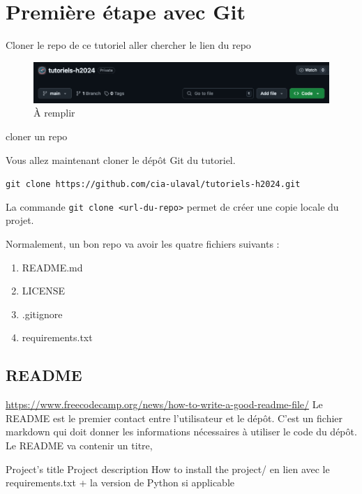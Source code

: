 \documentclass{book}
\newenvironment{myexampleblock}[1]{%
    \tcolorbox[beamer,%
    noparskip,breakable,
    colback=LightGreen,colframe=DarkGreen,%
    colbacklower=LimeGreen!75!LightGreen,%
    title={#1}, width=\textwidth]}%
    {\endtcolorbox}
\newenvironment{myblock}[1]{%
    \tcolorbox[beamer,%
    noparskip,breakable,
    colback=LightBlue,colframe=DarkBlue,%
    colbacklower=DarkBlue!75!LightBlue,%
    title={#1}, width=\textwidth]}%
    {\endtcolorbox}
\begin{document}
\section{Première étape avec Git}

Cloner le repo de ce tutoriel
aller chercher le lien du repo

\begin{figure}[!h]
    \includegraphics[width=\textwidth]{images/clone_button_github.png}
    \caption{À remplir} \label{fig:clone_button}
\end{figure}

cloner un repo

\begin{myexampleblock}{Exercice : Clôner le dépôt du tutoriel}
Vous allez maintenant cloner le dépôt Git du tutoriel.

\texttt{git clone https://github.com/cia-ulaval/tutoriels-h2024.git}

\end{myexampleblock}



\begin{myblock}{git clone}
    La commande \texttt{git clone <url-du-repo>} permet de créer une copie locale du projet. 
\end{myblock}

Normalement, un bon repo va avoir les quatre fichiers suivants : 
\begin{enumerate}
    \item README.md
    \item LICENSE
    \item .gitignore
    \item requirements.txt
\end{enumerate}

\subsection{README}
\url{https://www.freecodecamp.org/news/how-to-write-a-good-readme-file/}
Le README est le premier contact entre l'utilisateur et le dépôt. C'est un fichier markdown qui doit donner les informations nécessaires à utiliser le code du dépôt. Le README va contenir un titre, 

Project's title
Project description
How to install the project/ en lien avec le requirements.txt + la version de Python si applicable
\end{document}
